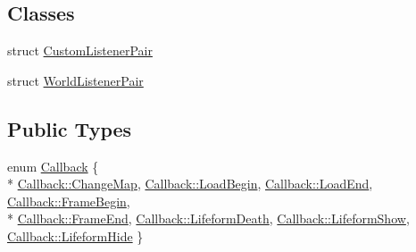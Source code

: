 \subsection*{Classes}
\begin{DoxyCompactItemize}
\item 
struct \hyperlink{structZeta_1_1WorldManager_1_1CustomListenerPair}{Custom\+Listener\+Pair}
\item 
struct \hyperlink{structZeta_1_1WorldManager_1_1WorldListenerPair}{World\+Listener\+Pair}
\end{DoxyCompactItemize}
\subsection*{Public Types}
\begin{DoxyCompactItemize}
\item 
enum \hyperlink{classZeta_1_1WorldManager_a196f5dc39fe2f6856871fef729fd8454}{Callback} \{ \\*
\hyperlink{classZeta_1_1WorldManager_a196f5dc39fe2f6856871fef729fd8454aee08e9af3756988e590473fb1a0f665a}{Callback\+::\+Change\+Map}, 
\hyperlink{classZeta_1_1WorldManager_a196f5dc39fe2f6856871fef729fd8454a0d3b6dc88480174d6661969e534d0d9b}{Callback\+::\+Load\+Begin}, 
\hyperlink{classZeta_1_1WorldManager_a196f5dc39fe2f6856871fef729fd8454a1b36a8205a97ee21ebf3c7ba6b102e00}{Callback\+::\+Load\+End}, 
\hyperlink{classZeta_1_1WorldManager_a196f5dc39fe2f6856871fef729fd8454a0526bfe956591337eeb68eca998aec15}{Callback\+::\+Frame\+Begin}, 
\\*
\hyperlink{classZeta_1_1WorldManager_a196f5dc39fe2f6856871fef729fd8454af32dfac7bfae19e243e9e6d180228666}{Callback\+::\+Frame\+End}, 
\hyperlink{classZeta_1_1WorldManager_a196f5dc39fe2f6856871fef729fd8454a8ae8b593221ee011d37755b192c9e3a9}{Callback\+::\+Lifeform\+Death}, 
\hyperlink{classZeta_1_1WorldManager_a196f5dc39fe2f6856871fef729fd8454a4b9fb8826787149b3c2f7ce8a50c15ee}{Callback\+::\+Lifeform\+Show}, 
\hyperlink{classZeta_1_1WorldManager_a196f5dc39fe2f6856871fef729fd8454a4c9a6f5b49e21d29060d50c07a9dbe69}{Callback\+::\+Lifeform\+Hide}
 \}
\end{DoxyCompactItemize}
